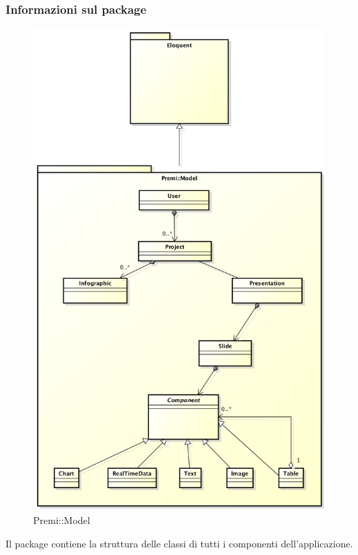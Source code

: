 	\subsubsection*{Informazioni sul package}
\begin{figure}[h]
\centering
\includegraphics[width=0.7\linewidth]{img/premi_http_model}
\caption[Premi::Model]{Premi::Model}
\label{fig:premi_http_model}
\end{figure}
		Il package contiene la struttura delle classi di tutti i componenti dell'applicazione.
	
